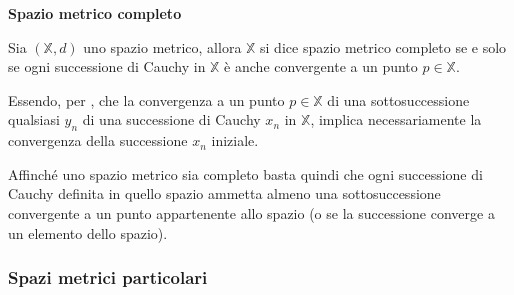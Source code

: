 \begin{definition}
    \textbf{Spazio metrico completo}

    Sia $\left(\mathbb{X}, d\right)$ uno spazio metrico, allora $\mathbb{X}$ si dice spazio
    metrico completo se e solo se ogni successione di Cauchy in $\mathbb{X}$ è anche
    convergente a un punto $p\in\mathbb{X}$.
\end{definition}

\begin{observation}
    Essendo, per , che la convergenza a un punto $p\in\mathbb{X}$ di una
    sottosuccessione qualsiasi $y_n$ di una successione di Cauchy $x_n$ in $\mathbb{X}$, implica necessariamente
    la convergenza della successione $x_n$ iniziale.

    Affinché uno spazio metrico sia completo basta quindi che ogni successione di Cauchy
    definita in quello spazio ammetta almeno una sottosuccessione convergente a un punto
    appartenente allo spazio (o se la successione converge a un elemento dello spazio).
\end{observation}

\subsubsection{Spazi metrici particolari}

